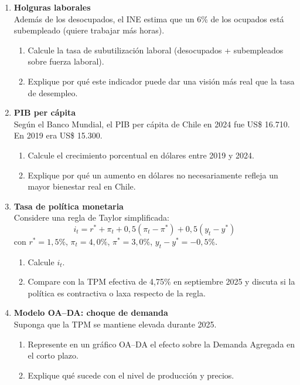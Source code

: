 \documentclass[11pt,addpoints]{article}
\begin{document}
\begin{enumerate}
\item \textbf{Holguras laborales}\\
Además de los desocupados, el INE estima que un 6\% de los ocupados está subempleado (quiere trabajar más horas).
\begin{enumerate}[label=(\alph*)]
\item Calcule la tasa de subutilización laboral (desocupados + subempleados sobre fuerza laboral).
\item Explique por qué este indicador puede dar una visión más real que la tasa de desempleo.
\end{enumerate}

\item \textbf{PIB per cápita}\\
Según el Banco Mundial, el PIB per cápita de Chile en 2024 fue US\$ 16.710. En 2019 era US\$ 15.300.
\begin{enumerate}[label=(\alph*)]
\item Calcule el crecimiento porcentual en dólares entre 2019 y 2024.
\item Explique por qué un aumento en dólares no necesariamente refleja un mayor bienestar real en Chile.
\end{enumerate}

\newpage %
\vspace*{0.1cm} %
\item \textbf{Tasa de política monetaria}\\
Considere una regla de Taylor simplificada:
\[
i_t = r^{\ast} + \pi_t + 0{,}5(\pi_t - \pi^{\ast}) + 0{,}5(y_t - y^{\ast})
\]
con $r^{\ast}=1{,}5\%$, $\pi_t=4{,}0\%$, $\pi^{\ast}=3{,}0\%$, $y_t - y^{\ast}=-0{,}5\%$.
\begin{enumerate}[label=(\alph*)]
\item Calcule $i_t$.
\item Compare con la TPM efectiva de 4,75\% en septiembre 2025 y discuta si la política es contractiva o laxa respecto de la regla.
\end{enumerate}

\item \textbf{Modelo OA--DA: choque de demanda}\\
Suponga que la TPM se mantiene elevada durante 2025.
\begin{enumerate}[label=(\alph*)]
\item Represente en un gráfico OA--DA el efecto sobre la Demanda Agregada en el corto plazo.
\item Explique qué sucede con el nivel de producción y precios.
\end{enumerate}


\end{enumerate}
\end{document}
